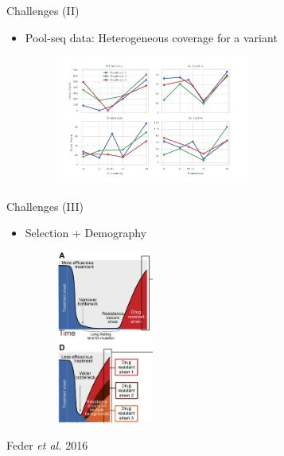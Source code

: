 \documentclass[t]{beamer} %
\begin{document}
\begin{frame}{Challenges (II)}
	\begin{itemize}
		\item Pool-seq data: Heterogeneous coverage for a variant
		\begin{figure}
			\includegraphics[trim={0in 0.0in 0.0in 
				0in},clip,width=0.6\textwidth]{../figures/depthHetero.pdf}
		\end{figure}
	\end{itemize}
\end{frame}

\begin{frame}{Challenges (III)}
	\begin{itemize}
		\item Selection + Demography
				\begin{figure}
					\includegraphics[trim={0in 0.0in 0.0in 
						0in},clip,width=0.3\textwidth]{../figures/HIV.png}
				\end{figure}
	\end{itemize}
		\tiny{Feder \emph{et al.} 2016}
\end{frame}
\end{document}
